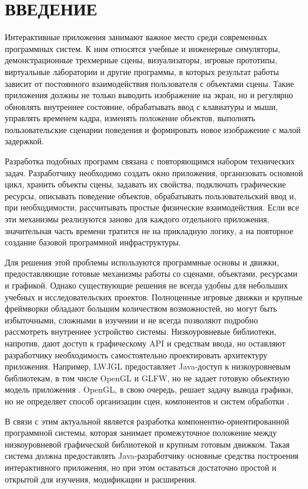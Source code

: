 \section*{ВВЕДЕНИЕ}

Интерактивные приложения занимают важное место среди современных программных систем. К ним относятся учебные и инженерные симуляторы, демонстрационные трехмерные сцены, визуализаторы, игровые прототипы, виртуальные лаборатории и другие программы, в которых результат работы зависит от постоянного взаимодействия пользователя с объектами сцены. Такие приложения должны не только выводить изображение на экран, но и регулярно обновлять внутреннее состояние, обрабатывать ввод с клавиатуры и мыши, управлять временем кадра, изменять положение объектов, выполнять пользовательские сценарии поведения и формировать новое изображение с малой задержкой.

Разработка подобных программ связана с повторяющимся набором технических задач. Разработчику необходимо создать окно приложения, организовать основной цикл, хранить объекты сцены, задавать их свойства, подключать графические ресурсы, описывать поведение объектов, обрабатывать пользовательский ввод и, при необходимости, рассчитывать простые физические взаимодействия. Если все эти механизмы реализуются заново для каждого отдельного приложения, значительная часть времени тратится не на прикладную логику, а на повторное создание базовой программной инфраструктуры.

Для решения этой проблемы используются программные основы и движки, предоставляющие готовые механизмы работы со сценами, объектами, ресурсами и графикой. Однако существующие решения не всегда удобны для небольших учебных и исследовательских проектов. Полноценные игровые движки и крупные фреймворки обладают большим количеством возможностей, но могут быть избыточными, сложными в изучении и не всегда позволяют подробно рассмотреть внутреннее устройство системы. Низкоуровневые библиотеки, напротив, дают доступ к графическому API и средствам ввода, но оставляют разработчику необходимость самостоятельно проектировать архитектуру приложения. Например, LWJGL предоставляет Java-доступ к низкоуровневым библиотекам, в том числе OpenGL и GLFW, но не задает готовую объектную модель приложения \cite{lwjgl}. OpenGL, в свою очередь, решает задачу вывода графики, но не определяет способ организации сцен, компонентов и систем обработки \cite{khronos-opengl}.

В связи с этим актуальной является разработка компонентно-ориентированной программной системы, которая занимает промежуточное положение между низкоуровневой графической библиотекой и крупным готовым движком. Такая система должна предоставлять Java-разработчику основные средства построения интерактивного приложения, но при этом оставаться достаточно простой и открытой для изучения, модификации и расширения.

